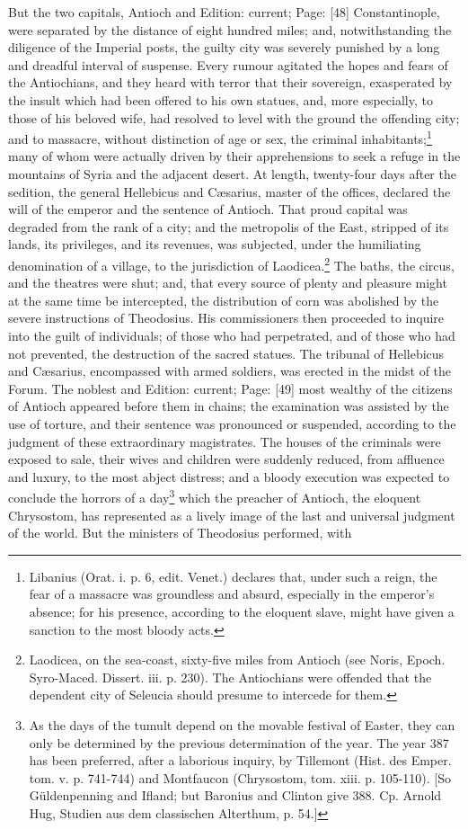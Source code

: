 But the two capitals, Antioch and Edition: current; Page: [48] Constantinople, were separated by the distance of eight hundred miles; and, notwithstanding the diligence of the Imperial posts, the guilty city was severely punished by a long and dreadful interval of suspense. Every rumour agitated the hopes and fears of the Antiochians, and they heard with terror that their sovereign, exasperated by the insult which had been offered to his own statues, and, more especially, to those of his beloved wife, had resolved to level with the ground the offending city; and to massacre, without distinction of age or sex, the criminal inhabitants;\footnote{Libanius (Orat. i. p. 6, edit. Venet.) declares that, under such a reign, the fear of a massacre was groundless and absurd, especially in the emperor\texthebrew{}’s absence; for his presence, according to the eloquent slave, might have given a sanction to the most bloody acts.} many of whom were actually driven by their apprehensions to seek a refuge in the mountains of Syria and the adjacent desert. At length, twenty-four days after the sedition, the general Hellebicus and Cæsarius, master of the offices, declared the will of the emperor and the sentence of Antioch. That proud capital was degraded from the rank of a city; and the metropolis of the East, stripped of its lands, its privileges, and its revenues, was subjected, under the humiliating denomination of a village, to the jurisdiction of Laodicea.\footnote{Laodicea, on the sea-coast, sixty-five miles from Antioch (see Noris, Epoch. Syro-Maced. Dissert. iii. p. 230). The Antiochians were offended that the dependent city of Seleucia should presume to intercede for them.} The baths, the circus, and the theatres were shut; and, that every source of plenty and pleasure might at the same time be intercepted, the distribution of corn was abolished by the severe instructions of Theodosius. His commissioners then proceeded to inquire into the guilt of individuals; of those who had perpetrated, and of those who had not prevented, the destruction of the sacred statues. The tribunal of Hellebicus and Cæsarius, encompassed with armed soldiers, was erected in the midst of the Forum. The noblest and Edition: current; Page: [49] most wealthy of the citizens of Antioch appeared before them in chains; the examination was assisted by the use of torture, and their sentence was pronounced or suspended, according to the judgment of these extraordinary magistrates. The houses of the criminals were exposed to sale, their wives and children were suddenly reduced, from affluence and luxury, to the most abject distress; and a bloody execution was expected to conclude the horrors of a day\footnote{As the days of the tumult depend on the movable festival of Easter, they can only be determined by the previous determination of the year. The year 387 has been preferred, after a laborious inquiry, by Tillemont (Hist. des Emper. tom. v. p. 741-744) and Montfaucon (Chrysostom, tom. xiii. p. 105-110). [So Güldenpenning and Ifland; but Baronius and Clinton give 388. Cp. Arnold Hug, Studien aus dem classischen Alterthum, p. 54.]} which the preacher of Antioch, the eloquent Chrysostom, has represented as a lively image of the last and universal judgment of the world. But the ministers of Theodosius performed, with 